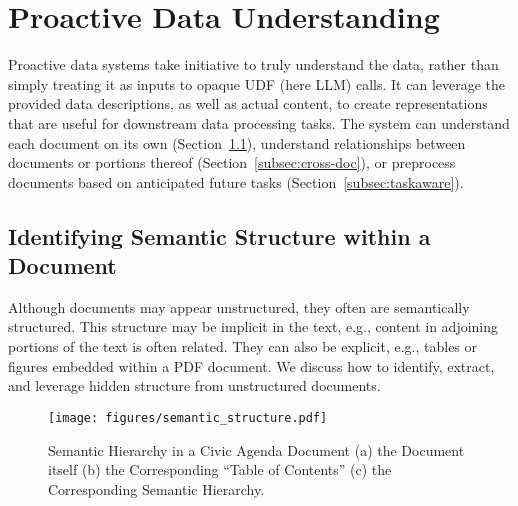 
\section{Proactive Data Understanding}\label{sec:data}
Proactive data systems take initiative to truly
understand the data, rather than simply treating
it as inputs to opaque UDF (here LLM) calls.
It can leverage
the provided data descriptions,
as well as actual content,
to create representations
that are useful for downstream data
processing tasks.
The system can understand 
each document on its own (Section~\ref{subsec:structure}), 
understand relationships between documents
or portions thereof (Section~\ref{subsec:cross-doc}), 
or preprocess documents based on anticipated future tasks (Section~\ref{subsec:taskaware}).


\subsection{Identifying Semantic Structure 
within a Document}
\label{subsec:structure}


Although documents may appear unstructured, 
they often are semantically structured.
This structure may
be implicit in the text, e.g.,
content in adjoining portions of the text is often related. 
They can also be explicit, e.g., 
tables or figures embedded within a PDF document. 
We discuss how to identify,
extract, and leverage hidden structure 
from unstructured documents. 

\begin{figure}[tb]
    \centering
    \vspace{-20pt}
    \texttt{[image: figures/semantic\_structure.pdf]}
    \vspace{-10pt}
    \caption{Semantic Hierarchy in a Civic Agenda Document (a) the Document itself (b) the Corresponding
    ``Table of Contents'' (c) the Corresponding Semantic Hierarchy.
    }
    \label{fig:civic}
    \vspace{-10pt}
\end{figure}

